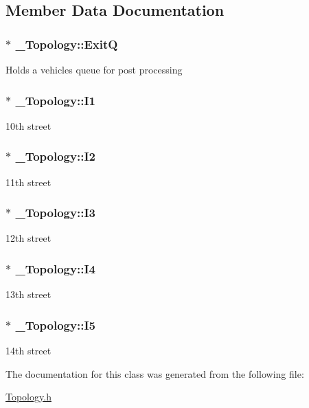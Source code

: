 \subsection{Member Data Documentation}
\hypertarget{class___topology_a6f52e458294112feaf5ef76ab457b540}{
\subsubsection[{Exit\-Q}]{$\ast$ \-\_\-\-Topology\-::\-Exit\-Q}}\label{class___topology_a6f52e458294112feaf5ef76ab457b540}
Holds a vehicles queue for post processing \hypertarget{class___topology_a22e676a8a8519d5e81264facc142cd4c}{
\subsubsection[{I1}]{$\ast$ \-\_\-\-Topology\-::\-I1}}\label{class___topology_a22e676a8a8519d5e81264facc142cd4c}
10th street \hypertarget{class___topology_add9dde7506b1951f72fc82737a448f3e}{
\subsubsection[{I2}]{$\ast$ \-\_\-\-Topology\-::\-I2}}\label{class___topology_add9dde7506b1951f72fc82737a448f3e}
11th street \hypertarget{class___topology_a5853e98887c0354e46d72c66e434d835}{
\subsubsection[{I3}]{$\ast$ \-\_\-\-Topology\-::\-I3}}\label{class___topology_a5853e98887c0354e46d72c66e434d835}
12th street \hypertarget{class___topology_a6ed4a6f988c5879829337e3c819acf61}{
\subsubsection[{I4}]{$\ast$ \-\_\-\-Topology\-::\-I4}}\label{class___topology_a6ed4a6f988c5879829337e3c819acf61}
13th street \hypertarget{class___topology_a863a6dbc380236cc23cf4df6a9e24136}{
\subsubsection[{I5}]{$\ast$ \-\_\-\-Topology\-::\-I5}}\label{class___topology_a863a6dbc380236cc23cf4df6a9e24136}
14th street 

The documentation for this class was generated from the following file\-:\begin{DoxyCompactItemize}
\item 
\hyperlink{_topology_8h}{Topology.\-h}\end{DoxyCompactItemize}
